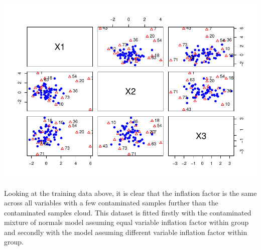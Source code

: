 \documentclass[
]{article}
\newenvironment{Shaded}{\begin{snugshade}}{\end{snugshade}}
\newcommand{\AttributeTok}[1]{\textcolor[rgb]{0.77,0.63,0.00}{#1}}
\newcommand{\CommentTok}[1]{\textcolor[rgb]{0.56,0.35,0.01}{\textit{#1}}}
\newcommand{\ControlFlowTok}[1]{\textcolor[rgb]{0.13,0.29,0.53}{\textbf{#1}}}
\newcommand{\DecValTok}[1]{\textcolor[rgb]{0.00,0.00,0.81}{#1}}
\newcommand{\FunctionTok}[1]{\textcolor[rgb]{0.00,0.00,0.00}{#1}}
\newcommand{\NormalTok}[1]{#1}
\newcommand{\SpecialCharTok}[1]{\textcolor[rgb]{0.00,0.00,0.00}{#1}}
\newcommand{\StringTok}[1]{\textcolor[rgb]{0.31,0.60,0.02}{#1}}
\begin{document}
\begin{Shaded}
\end{Shaded}

\includegraphics{DifferentVarInflationFactors_files/figure-latex/plotA_training-1.pdf}

Looking at the training data above, it is clear that the inflation
factor is the same across all variables with a few contaminated samples
further than the contaminated samples cloud. This dataset is fitted
firstly with the contaminated mixture of normals model assuming equal
variable inflation factor within group and secondly with the model
assuming different variable inflation factor within group.
\end{document}
